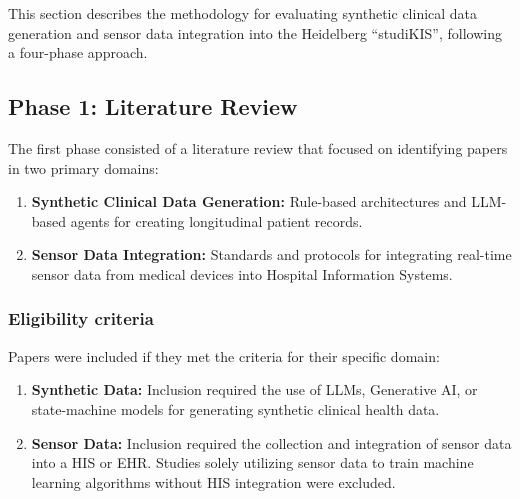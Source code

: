 This section describes the methodology for evaluating synthetic clinical data generation and sensor data integration into the Heidelberg \enquote{studiKIS}, following a four-phase approach.

\subsection*{Phase 1: Literature Review}
The first phase consisted of a literature review that focused on identifying papers in two primary domains:
\begin{enumerate}
\item \textbf{Synthetic Clinical Data Generation:} Rule-based architectures and LLM-based agents for creating longitudinal patient records.
\item \textbf{Sensor Data Integration:} Standards and protocols for integrating real-time sensor data from medical devices into Hospital Information Systems.
\end{enumerate}

\subsubsection*{Eligibility criteria}
Papers were included if they met the criteria for their specific domain:
\begin{enumerate}
\item \textbf{Synthetic Data:} Inclusion required the use of LLMs, Generative AI, or state-machine models for generating synthetic clinical health data.
\item \textbf{Sensor Data:} Inclusion required the collection and integration of sensor data into a HIS or EHR. Studies solely utilizing sensor data to train machine learning algorithms without HIS integration were excluded.
\end{enumerate}

